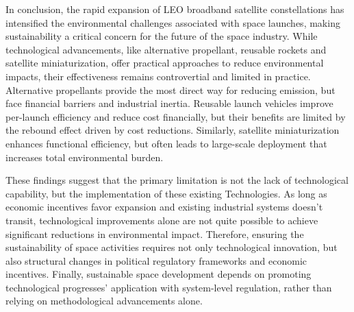 \documentclass[12pt]{article}
\begin{document}
In conclusion, the rapid expansion of LEO broadband satellite constellations has intensified the environmental challenges associated with space launches, making sustainability a critical concern for the future of the space industry. While technological advancements, like alternative propellant, reusable rockets and satellite miniaturization, offer practical approaches to reduce environmental impacts, their effectiveness remains controvertial and limited in practice. Alternative propellants provide the most direct way for reducing emission, but face financial barriers and industrial inertia. Reusable launch vehicles improve per-launch efficiency and reduce cost financially, but their benefits are limited by the rebound effect driven by cost reductions. Similarly, satellite miniaturization enhances functional efficiency, but often leads to large-scale deployment that increases total environmental burden.



These findings suggest that the primary limitation is not the lack of technological capability, but the implementation of these existing Technologies. As long as economic incentives favor expansion and existing industrial systems doesn't transit, technological improvements alone are not quite possible to achieve significant reductions in environmental impact. Therefore, ensuring the sustainability of space activities requires not only technological innovation, but also structural changes in political regulatory frameworks and economic incentives. Finally, sustainable space development depends on promoting technological progresses' application with system-level regulation, rather than relying on methodological advancements alone.





\newpage


\end{document}
